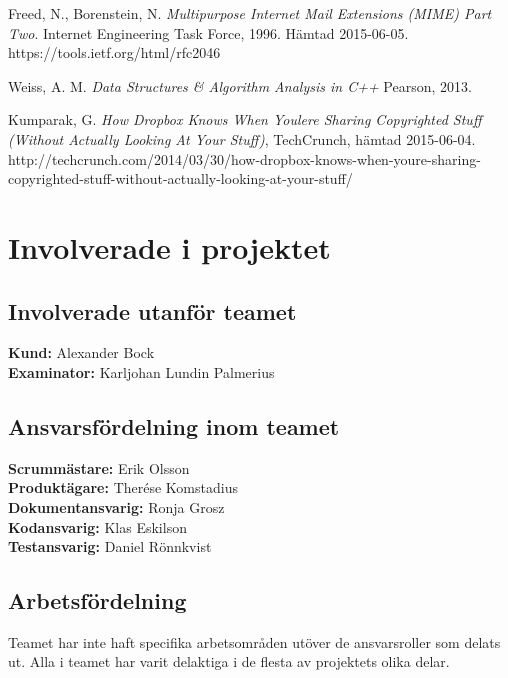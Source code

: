 \documentclass[a4paper,12pt,oneside,final]{extbook}
\begin{document}
\begin{thebibliography}{99}
  Freed, N., Borenstein, N.
  \emph{Multipurpose Internet Mail Extensions (MIME) Part Two}.
  Internet Engineering Task Force, 1996. Hämtad 2015-06-05.  https://tools.ietf.org/html/rfc2046

  Weiss, A. M.
  \emph{Data Structures \& Algorithm Analysis in C++}
  Pearson, 2013.

  Kumparak, G. \emph{How Dropbox Knows When Youlere Sharing Copyrighted Stuff (Without Actually Looking At Your Stuff)}, TechCrunch, hämtad 2015-06-04. http://techcrunch.com/2014/03/30/how-dropbox-knows-when-youre-sharing-copyrighted-stuff-without-actually-looking-at-your-stuff/

\end{thebibliography}


\appendix

\chapter{Involverade i projektet}
\section{Involverade utanför teamet}
\textbf{Kund:} Alexander Bock \\
\textbf{Examinator:} Karljohan Lundin Palmerius

\section{Ansvarsfördelning inom teamet}
\textbf{Scrummästare:} Erik Olsson \\
\textbf{Produktägare:} Therése Komstadius \\
\textbf{Dokumentansvarig:} Ronja Grosz \\
\textbf{Kodansvarig:} Klas Eskilson \\
\textbf{Testansvarig:} Daniel Rönnkvist

\section{Arbetsfördelning}
Teamet har inte haft specifika arbetsområden utöver de ansvarsroller som delats
ut. Alla i teamet har varit delaktiga i de flesta av projektets olika delar.
\end{document}
